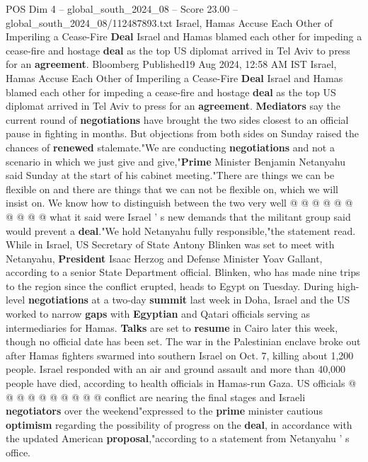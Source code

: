 \begin{textsample}{POS Dim 4 – global\_south\_2024\_08 – Score 23.00 – global\_south\_2024\_08/112487893.txt}  \label{ex:f4_pos_126}
Israel, Hamas Accuse Each Other of Imperiling a Cease-Fire \textbf{Deal} Israel and Hamas blamed each other for impeding a cease-fire and hostage \textbf{deal} as the top US diplomat arrived in Tel Aviv to press for an \textbf{agreement}.
Bloomberg Published19 Aug 2024, 12:58 AM IST Israel, Hamas Accuse Each Other of Imperiling a Cease-Fire \textbf{Deal} Israel and Hamas blamed each other for impeding a cease-fire and hostage \textbf{deal} as the top US diplomat arrived in Tel Aviv to press for an \textbf{agreement}. \textbf{Mediators} say the current round of \textbf{negotiations} have brought the two sides closest to an official pause in fighting in months.
But objections from both sides on Sunday raised the chances of \textbf{renewed} stalemate."We are conducting \textbf{negotiations} and not a scenario in which we just give and give,"\textbf{Prime} Minister Benjamin Netanyahu said Sunday at the start of his cabinet meeting."There are things we can be flexible on and there are things that we can not be flexible on, which we will insist on.
We know how to distinguish between the two very well @ @ @ @ @ @ @ @ @ @ what it said were Israel ' s new demands that the militant group said would prevent a \textbf{deal}."We hold Netanyahu fully responsible,"the statement read.
While in Israel, US Secretary of State Antony Blinken was set to meet with Netanyahu, \textbf{President} Isaac Herzog and Defense Minister Yoav Gallant, according to a senior State Department official.
Blinken, who has made nine trips to the region since the conflict erupted, heads to Egypt on Tuesday.
During high-level \textbf{negotiations} at a two-day \textbf{summit} last week in Doha, Israel and the US worked to narrow \textbf{gaps} with \textbf{Egyptian} and Qatari officials serving as intermediaries for Hamas. \textbf{Talks} are set to \textbf{resume} in Cairo later this week, though no official date has been set.
The war in the Palestinian enclave broke out after Hamas fighters swarmed into southern Israel on Oct. 7, killing about 1,200 people.
Israel responded with an air and ground assault and more than 40,000 people have died, according to health officials in Hamas-run Gaza.
US officials @ @ @ @ @ @ @ @ @ @ conflict are nearing the final stages and Israeli \textbf{negotiators} over the weekend"expressed to the \textbf{prime} minister cautious \textbf{optimism} regarding the possibility of progress on the \textbf{deal}, in accordance with the updated American \textbf{proposal},"according to a statement from Netanyahu ' s office.

\end{textsample}
